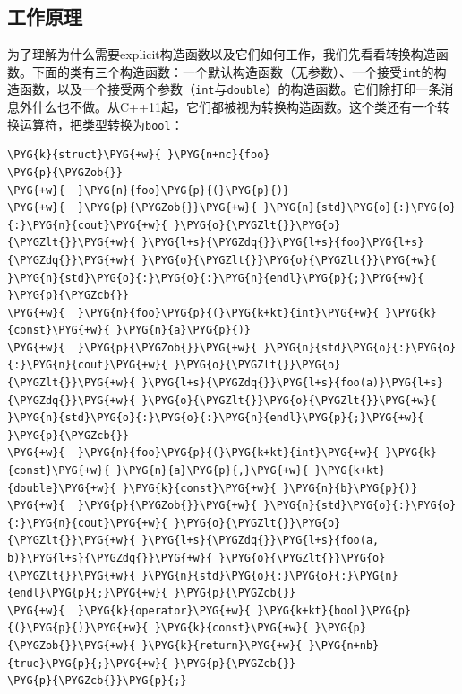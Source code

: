 
\subsection{工作原理}



为了理解为什么需要explicit构造函数以及它们如何工作，我们先看看转换构造函数。下面的类有三个构造函数：一个默认构造函数（无参数）、一个接受\texttt{int}的构造函数，以及一个接受两个参数（\texttt{int}与\texttt{double}）的构造函数。它们除打印一条消息外什么也不做。从C++11起，它们都被视为转换构造函数。这个类还有一个转换运算符，把类型转换为\texttt{bool}：



\begin{codeblockbg}
\begin{Verbatim}[commandchars=\\\{\},breaklines=true,breakanywhere=true,fontsize=\codefont,xleftmargin=17bp]
\PYG{k}{struct}\PYG{+w}{ }\PYG{n+nc}{foo}
\PYG{p}{\PYGZob{}}
\PYG{+w}{  }\PYG{n}{foo}\PYG{p}{(}\PYG{p}{)}
\PYG{+w}{  }\PYG{p}{\PYGZob{}}\PYG{+w}{ }\PYG{n}{std}\PYG{o}{:}\PYG{o}{:}\PYG{n}{cout}\PYG{+w}{ }\PYG{o}{\PYGZlt{}}\PYG{o}{\PYGZlt{}}\PYG{+w}{ }\PYG{l+s}{\PYGZdq{}}\PYG{l+s}{foo}\PYG{l+s}{\PYGZdq{}}\PYG{+w}{ }\PYG{o}{\PYGZlt{}}\PYG{o}{\PYGZlt{}}\PYG{+w}{ }\PYG{n}{std}\PYG{o}{:}\PYG{o}{:}\PYG{n}{endl}\PYG{p}{;}\PYG{+w}{ }\PYG{p}{\PYGZcb{}}
\PYG{+w}{  }\PYG{n}{foo}\PYG{p}{(}\PYG{k+kt}{int}\PYG{+w}{ }\PYG{k}{const}\PYG{+w}{ }\PYG{n}{a}\PYG{p}{)}
\PYG{+w}{  }\PYG{p}{\PYGZob{}}\PYG{+w}{ }\PYG{n}{std}\PYG{o}{:}\PYG{o}{:}\PYG{n}{cout}\PYG{+w}{ }\PYG{o}{\PYGZlt{}}\PYG{o}{\PYGZlt{}}\PYG{+w}{ }\PYG{l+s}{\PYGZdq{}}\PYG{l+s}{foo(a)}\PYG{l+s}{\PYGZdq{}}\PYG{+w}{ }\PYG{o}{\PYGZlt{}}\PYG{o}{\PYGZlt{}}\PYG{+w}{ }\PYG{n}{std}\PYG{o}{:}\PYG{o}{:}\PYG{n}{endl}\PYG{p}{;}\PYG{+w}{ }\PYG{p}{\PYGZcb{}}
\PYG{+w}{  }\PYG{n}{foo}\PYG{p}{(}\PYG{k+kt}{int}\PYG{+w}{ }\PYG{k}{const}\PYG{+w}{ }\PYG{n}{a}\PYG{p}{,}\PYG{+w}{ }\PYG{k+kt}{double}\PYG{+w}{ }\PYG{k}{const}\PYG{+w}{ }\PYG{n}{b}\PYG{p}{)}
\PYG{+w}{  }\PYG{p}{\PYGZob{}}\PYG{+w}{ }\PYG{n}{std}\PYG{o}{:}\PYG{o}{:}\PYG{n}{cout}\PYG{+w}{ }\PYG{o}{\PYGZlt{}}\PYG{o}{\PYGZlt{}}\PYG{+w}{ }\PYG{l+s}{\PYGZdq{}}\PYG{l+s}{foo(a, b)}\PYG{l+s}{\PYGZdq{}}\PYG{+w}{ }\PYG{o}{\PYGZlt{}}\PYG{o}{\PYGZlt{}}\PYG{+w}{ }\PYG{n}{std}\PYG{o}{:}\PYG{o}{:}\PYG{n}{endl}\PYG{p}{;}\PYG{+w}{ }\PYG{p}{\PYGZcb{}}
\PYG{+w}{  }\PYG{k}{operator}\PYG{+w}{ }\PYG{k+kt}{bool}\PYG{p}{(}\PYG{p}{)}\PYG{+w}{ }\PYG{k}{const}\PYG{+w}{ }\PYG{p}{\PYGZob{}}\PYG{+w}{ }\PYG{k}{return}\PYG{+w}{ }\PYG{n+nb}{true}\PYG{p}{;}\PYG{+w}{ }\PYG{p}{\PYGZcb{}}
\PYG{p}{\PYGZcb{}}\PYG{p}{;}
\end{Verbatim}
\end{codeblockbg}


